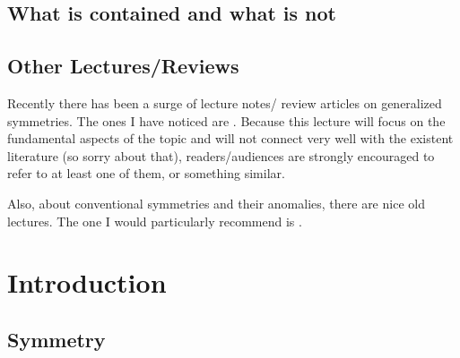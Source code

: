 \documentclass[
  letterpaper,
  DIV=11,
  numbers=noendperiod]{scrreport}
\begin{document}
\hypertarget{what-is-contained-and-what-is-not}{%
\section*{What is contained and what is
not}\label{what-is-contained-and-what-is-not}}


\hypertarget{other-lecturesreviews}{%
\section*{Other Lectures/Reviews}\label{other-lecturesreviews}}


Recently there has been a surge of lecture notes/ review articles on
generalized symmetries. The ones I have noticed are
\autocite{McGreevy:2022oyu,Schafer-Nameki:2023jdn,Gomes:2023ahz,Bhardwaj:2023kri,Luo:2023ive,Shao:2023gho}.
Because this lecture will focus on the fundamental aspects of the topic
and will not connect very well with the existent literature (so sorry
about that), readers/audiences are strongly encouraged to refer to at
least one of them, or something similar.

Also, about conventional symmetries and their anomalies, there are nice
old lectures. The one I would particularly recommend is
\autocite{TachikawaTasi}.


\hypertarget{introduction}{%
\chapter{Introduction}\label{introduction}}

\hypertarget{symmetry}{%
\section{Symmetry}\label{symmetry}}
\end{document}
